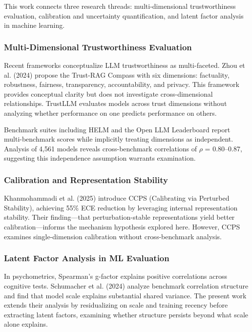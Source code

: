 
This work connects three research threads: multi-dimensional trustworthiness evaluation, calibration and uncertainty quantification, and latent factor analysis in machine learning.

\subsubsection{Multi-Dimensional Trustworthiness Evaluation}

Recent frameworks conceptualize LLM trustworthiness as multi-faceted. Zhou et al. (2024) propose the Trust-RAG Compass with six dimensions: factuality, robustness, fairness, transparency, accountability, and privacy. This framework provides conceptual clarity but does not investigate cross-dimensional relationships. TrustLLM \citep{sun2024trustllm} evaluates models across trust dimensions without analyzing whether performance on one predicts performance on others.

Benchmark suites including HELM \citep{liang2023helm} and the Open LLM Leaderboard \citep{beeching2023openllm} report multi-benchmark scores while implicitly treating dimensions as independent. Analysis of 4,561 models reveals cross-benchmark correlations of $\rho$ = 0.80--0.87, suggesting this independence assumption warrants examination.

\subsubsection{Calibration and Representation Stability}

Khanmohammadi et al. (2025) introduce CCPS (Calibrating via Perturbed Stability), achieving 55\% ECE reduction by leveraging internal representation stability. Their finding---that perturbation-stable representations yield better calibration---informs the mechanism hypothesis explored here. However, CCPS examines single-dimension calibration without cross-benchmark analysis.

\subsubsection{Latent Factor Analysis in ML Evaluation}

In psychometrics, Spearman's g-factor explains positive correlations across cognitive tests. Schumacher et al. (2024) analyze benchmark correlation structure and find that model scale explains substantial shared variance. The present work extends their analysis by residualizing on scale and training recency before extracting latent factors, examining whether structure persists beyond what scale alone explains.
